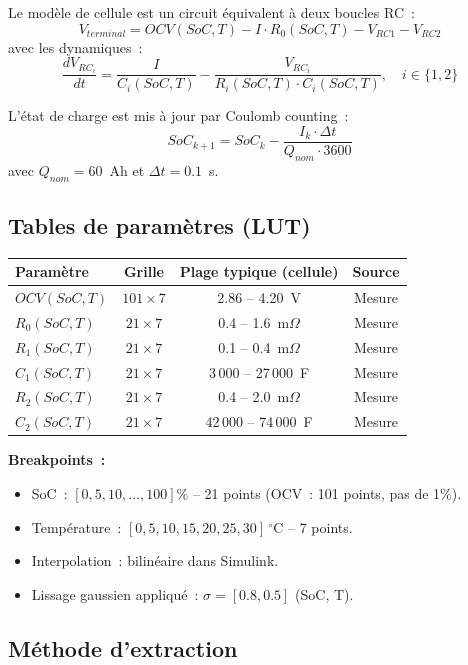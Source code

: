 \documentclass[a4paper,11pt]{article}
\begin{document}
Le modèle de cellule est un circuit équivalent à deux boucles RC~:
\[
  V_{terminal} = OCV(SoC, T) - I \cdot R_0(SoC, T) - V_{RC1} - V_{RC2}
\]
avec les dynamiques~:
\[
  \frac{dV_{RC_i}}{dt} = \frac{I}{C_i(SoC,T)} - \frac{V_{RC_i}}{R_i(SoC,T) \cdot C_i(SoC,T)}, \quad i \in \{1, 2\}
\]

L'état de charge est mis à jour par Coulomb counting~:
\[
  SoC_{k+1} = SoC_k - \frac{I_k \cdot \Delta t}{Q_{nom} \cdot 3600}
\]
avec $Q_{nom} = 60$~Ah et $\Delta t = 0.1$~s.

\subsection{Tables de paramètres (LUT)}

\begin{center}
\renewcommand{\arraystretch}{1.4}
\begin{tabular}{lccc}
\toprule
\textbf{Paramètre} & \textbf{Grille} & \textbf{Plage typique (cellule)} & \textbf{Source} \\
\midrule
$OCV(SoC, T)$ & $101 \times 7$ & 2.86 -- 4.20~V & Mesure \\
$R_0(SoC, T)$ & $21 \times 7$ & 0.4 -- 1.6~m$\Omega$ & Mesure \\
$R_1(SoC, T)$ & $21 \times 7$ & 0.1 -- 0.4~m$\Omega$ & Mesure \\
$C_1(SoC, T)$ & $21 \times 7$ & 3\,000 -- 27\,000~F & Mesure \\
$R_2(SoC, T)$ & $21 \times 7$ & 0.4 -- 2.0~m$\Omega$ & Mesure \\
$C_2(SoC, T)$ & $21 \times 7$ & 42\,000 -- 74\,000~F & Mesure \\
\bottomrule
\end{tabular}
\end{center}

\textbf{Breakpoints~:}
\begin{itemize}[nosep]
  \item SoC~: $[0, 5, 10, \ldots, 100]\%$ -- 21 points (OCV~: 101 points, pas de 1\%).
  \item Température~: $[0, 5, 10, 15, 20, 25, 30]\,^\circ$C -- 7 points.
  \item Interpolation~: bilinéaire dans Simulink.
  \item Lissage gaussien appliqué~: $\sigma = [0.8, 0.5]$ (SoC, T).
\end{itemize}

\subsection{Méthode d'extraction}
\end{document}
